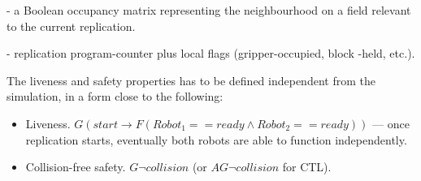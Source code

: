   - a Boolean occupancy matrix representing the neighbourhood on a field relevant to the current replication.

  - replication program-counter plus local flags (gripper-occupied, block -held, etc.).

  The liveness and safety properties has to be defined independent from the simulation, in a form close to the following:
  \begin{itemize}
    
      \item Liveness. $G (start \rightarrow F (Robot_1==ready \land Robot_2==ready))$ — once replication starts, eventually both robots are able to function independently.

      \item Collision-free safety. $G \neg collision$ (or $AG \neg collision$ for CTL).

\end{itemize}






